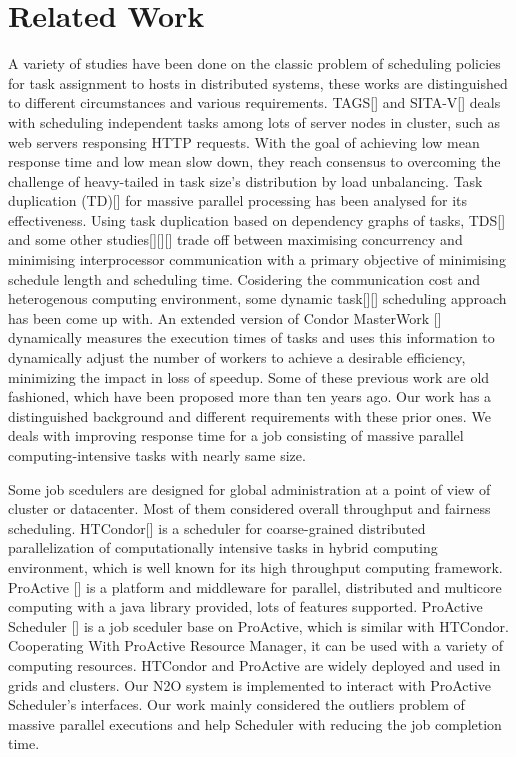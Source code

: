 \section{Related Work}

A variety of studies have been done on the classic problem of scheduling policies for task assignment to hosts in distributed systems, these works are distinguished to different circumstances and various requirements. TAGS[] and SITA-V[] deals with scheduling independent tasks among lots of server nodes in cluster, such as web servers responsing HTTP requests. With the goal of achieving low mean response time and low mean slow down, they reach consensus to overcoming the challenge of heavy-tailed in task size's distribution by load unbalancing. Task duplication (TD)[] for massive parallel processing has been analysed for its effectiveness. Using task duplication based on dependency graphs of tasks, TDS[] and some other studies[][][] trade off between maximising concurrency and minimising interprocessor communication with a primary objective of minimising schedule length and scheduling time. Cosidering the communication cost and heterogenous computing environment, some dynamic task[][] scheduling approach has been come up with. An extended version of Condor MasterWork [] dynamically measures the execution times of tasks and uses this information to dynamically adjust the number of workers to achieve a desirable efficiency, minimizing the impact in loss of speedup. Some of these previous work are old fashioned, which have been proposed more than ten years ago. Our work has a distinguished background and different requirements with these prior ones. We deals with improving response time for a job consisting of massive parallel computing-intensive tasks with nearly same size.

Some job scedulers are designed for global administration at a point of view of cluster or datacenter. Most of them considered overall throughput and fairness scheduling. HTCondor[] is a scheduler for coarse-grained distributed parallelization of computationally intensive tasks in hybrid computing environment, which is well known for its high throughput computing framework. ProActive [] is a platform and middleware for parallel, distributed and multicore computing with a java library provided, lots of features supported. ProActive Scheduler [] is a job sceduler base on ProActive, which is similar with HTCondor. Cooperating With ProActive Resource Manager, it can be used with a variety of computing resources. HTCondor and ProActive are widely deployed and used in grids and clusters. Our N2O system is implemented to interact with ProActive Scheduler's interfaces. Our work mainly considered the outliers problem of massive parallel executions and help Scheduler with reducing the job completion time.

